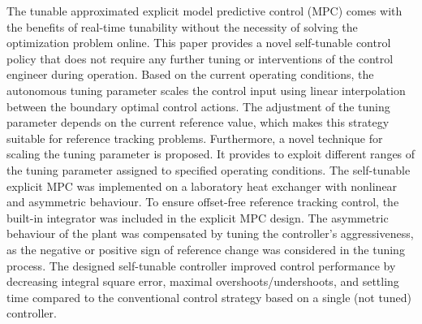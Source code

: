 \documentclass[preprint,12pt]{elsarticle}
\begin{document}
			The tunable approximated explicit model predictive control (MPC) comes with the benefits of real-time tunability without the necessity of solving the optimization problem online. This paper provides a novel self-tunable control policy that does not require any further tuning or interventions of the control engineer during operation. Based on the current operating conditions, the autonomous tuning parameter scales the control input using linear interpolation between the boundary optimal control actions. The adjustment of the tuning parameter depends on the current reference value, which makes this strategy suitable for reference tracking problems. Furthermore, a novel technique for scaling the tuning parameter is proposed. It provides to exploit different ranges of the tuning parameter assigned to specified operating conditions. The self-tunable explicit MPC was implemented on a laboratory heat exchanger with nonlinear and asymmetric behaviour. To ensure offset-free reference tracking control, the built-in integrator was included in the explicit MPC design. The asymmetric behaviour of the plant was compensated by tuning the controller's aggressiveness, as the negative or positive sign of reference change was considered in the tuning process. The designed self-tunable controller improved control performance by decreasing integral square error, maximal overshoots/undershoots, and settling time compared to the conventional control strategy based on a single (not tuned) controller. 
	
\end{document}

